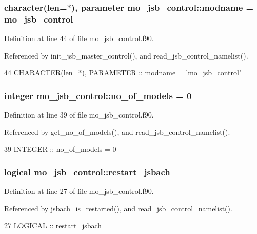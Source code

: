 \subsubsection[{modname}]{\setlength{\rightskip}{0pt plus 5cm}character(len=$\ast$), parameter mo\+\_\+jsb\+\_\+control\+::modname = \textquotesingle{}mo\+\_\+jsb\+\_\+control\textquotesingle{}}\label{namespacemo__jsb__control_aa28a5f0f9a2b85b29e9641a4bc9cd187}


Definition at line 44 of file mo\+\_\+jsb\+\_\+control.\+f90.



Referenced by init\+\_\+jsb\+\_\+master\+\_\+control(), and read\+\_\+jsb\+\_\+control\+\_\+namelist().


\begin{DoxyCode}
44   \textcolor{keywordtype}{CHARACTER(len=*)}, \textcolor{keywordtype}{PARAMETER} :: modname = \textcolor{stringliteral}{'mo\_jsb\_control'}
\end{DoxyCode}
\hypertarget{namespacemo__jsb__control_ae6883b2aa250bb4b2e2e8ef2d4edea31}{}
\subsubsection[{no\+\_\+of\+\_\+models}]{\setlength{\rightskip}{0pt plus 5cm}integer mo\+\_\+jsb\+\_\+control\+::no\+\_\+of\+\_\+models = 0}\label{namespacemo__jsb__control_ae6883b2aa250bb4b2e2e8ef2d4edea31}


Definition at line 39 of file mo\+\_\+jsb\+\_\+control.\+f90.



Referenced by get\+\_\+no\+\_\+of\+\_\+models(), and read\+\_\+jsb\+\_\+control\+\_\+namelist().


\begin{DoxyCode}
39   \textcolor{keywordtype}{INTEGER} :: no\_of\_models = 0
\end{DoxyCode}
\hypertarget{namespacemo__jsb__control_a569426bef03961a0e9a5acdf77ddf11a}{}
\subsubsection[{restart\+\_\+jsbach}]{\setlength{\rightskip}{0pt plus 5cm}logical mo\+\_\+jsb\+\_\+control\+::restart\+\_\+jsbach}\label{namespacemo__jsb__control_a569426bef03961a0e9a5acdf77ddf11a}


Definition at line 27 of file mo\+\_\+jsb\+\_\+control.\+f90.



Referenced by jsbach\+\_\+is\+\_\+restarted(), and read\+\_\+jsb\+\_\+control\+\_\+namelist().


\begin{DoxyCode}
27   \textcolor{keywordtype}{LOGICAL} :: restart\_jsbach
\end{DoxyCode}
